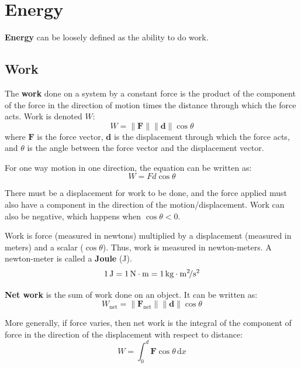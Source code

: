 \documentclass{article}
\newcommand{\definition}[1]{\begin{tcolorbox}[colback=red!5!white,colframe=red!75!black,parbox=false] #1 \end{tcolorbox}}
\begin{document}
\section{Energy}

\definition{\textbf{Energy} can be loosely defined as the ability to do work.}

\subsection{Work}

\definition{The \textbf{work} done on a system by a constant force is the product of the component of the force in the direction of motion times the distance through which the force acts. Work is denoted $W$:
\begin{equation*}
    W=\lVert \mathbf{F} \rVert \lVert \mathbf{d} \rVert \cos \theta
\end{equation*}
where $\mathbf{F}$ is the force vector, $\mathbf{d}$ is the displacement through which the force acts, and $\theta$ is the angle between the force vector and the displacement vector.
}

For one way motion in one direction, the equation can be written as:
\begin{equation*}
    W=Fd\cos\theta
\end{equation*}

There must be a displacement for work to be done, and the force applied must also have a component in the direction of the motion/displacement. Work can also be negative, which happens when $\cos\theta<0$.

Work is force (measured in newtons) multiplied by a displacement (measured in meters) and a scalar ($\cos\theta$). Thus, work is measured in newton-meters. A newton-meter is called a \textbf{Joule} (J).
\begin{equation*}
	1\,\si{\joule}
	=1\,\si[inter-unit-product=\cdot]{\newton\meter}
	=1\,\si[inter-unit-product=\cdot]{\kilo\gram\meter\squared\per\second\squared}
\end{equation*}

\definition{\textbf{Net work} is the sum of work done on an object. It can be written as:
\begin{equation*}
	W_{\text{net}}=\lVert \mathbf{F}_{\text{net}} \rVert \lVert \mathbf{d} \rVert \cos \theta
\end{equation*}
}

More generally, if force varies, then net work is the integral of the component of force in the direction of the displacement with respect to distance:
\begin{equation*}
    W=\int_{0}^{d}\mathbf{F}\cos\theta\,\mathrm{d}x
\end{equation*}
\end{document}
